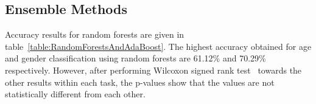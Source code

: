 \documentclass[a4paper]{llncs}
\begin{document}



\subsection{Ensemble Methods}
Accuracy results for random forests are given in table~\ref{table:RandomForestsAndAdaBoost}. The highest accuracy obtained for age and gender classification using random forests are 61.12\% and 70.29\% respectively. However, after performing Wilcoxon signed rank test~\cite{wilcoxon1945individual} towards the other results within each task, the p-values show that the values are not statistically different from each other.  
\end{document}
